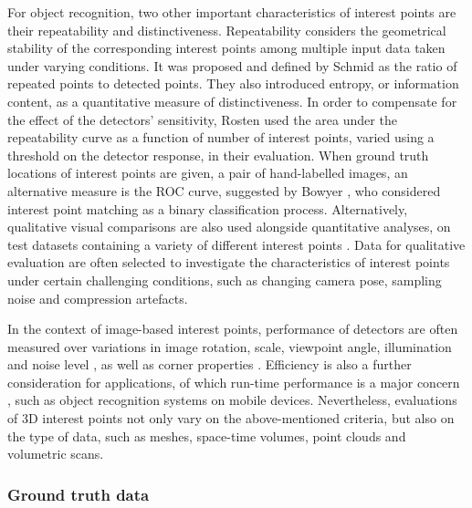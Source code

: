 For object recognition, two other important characteristics of interest points are their repeatability and distinctiveness. 
Repeatability considers the geometrical stability of the corresponding interest points among multiple input data taken under varying conditions. 
It was proposed and defined by Schmid \etal \cite{Schmid2000} as the ratio of repeated points to detected points. They also introduced entropy, or information content, as a quantitative measure of distinctiveness.
In order to compensate for the effect of the detectors' sensitivity, Rosten \etal \cite{Rosten2010} used the area under the repeatability curve as a function of number of interest points, varied using a threshold on the detector response, in their evaluation. 
When ground truth locations of interest points are given, \eg a pair of hand-labelled images, an alternative measure is the ROC curve, suggested by Bowyer \etal \cite{Bowyer1999}, who considered interest point matching as a binary classification process. Alternatively, qualitative visual comparisons are also used alongside quantitative analyses, on test datasets containing a variety of different interest points \cite{Lindeberg1998, Laptev2005}. Data for qualitative evaluation are often selected to investigate the characteristics of interest points under certain challenging conditions, such as changing camera pose, sampling noise and compression artefacts. 

In the context of image-based interest points, performance of detectors are often measured over variations in image rotation, scale, viewpoint angle, illumination and noise level \cite{Schmid2000}, as well as corner properties \cite{Rajan1989}. Efficiency is also a further consideration for applications, of which run-time performance is a major concern \cite{Rosten2010}, such as object recognition systems on mobile devices. Nevertheless, evaluations of 3D interest points not only vary on the above-mentioned criteria, but also on the type of data, such as meshes, space-time volumes, point clouds and volumetric scans.


\subsubsection{Ground truth data} 

